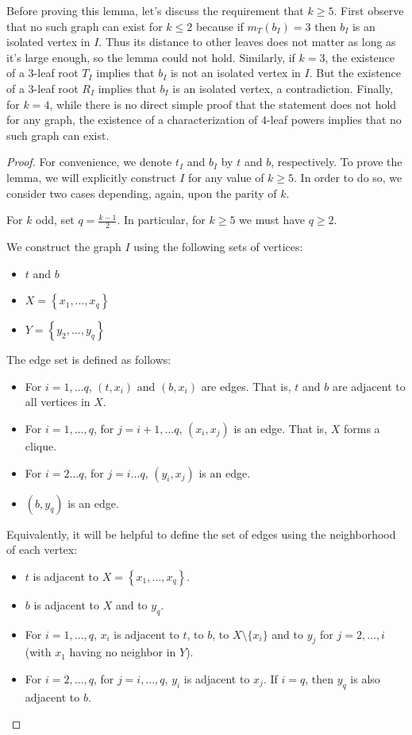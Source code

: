 \documentclass[11pt,letter]{article}
\theoremstyle{remark}
\newcommand{\set}[1]{\left\{#1\right\}}
\begin{document}
\ind*

Before proving this lemma, let's discuss the requirement that $k\ge 5$.
First observe that no such graph can exist for $k\leq 2$ because if $m_T(b_I)=3$ then $b_I$ is an isolated vertex in $I$. Thus its distance to other leaves does not matter as long as it's large enough, so the lemma could not hold.
Similarly, if $k=3$, the existence of a $3$-leaf root $T_I$ implies that $b_I$ is not an isolated vertex in $I$. But the existence of a $3$-leaf root $R_I$ implies that $b_I$ is an isolated vertex, a contradiction. 
Finally, for $k=4$, while there is no direct simple proof that the statement does not hold for any graph, 
the existence of a characterization of $4$-leaf powers implies that no such graph can exist.

\begin{proof}
    For convenience, we denote $t_I$ and $b_I$ by $t$ and $b$, respectively.
    To prove the lemma, we will explicitly construct $I$ for any value of $k\geq 5$. In order to do so, we consider two cases
    depending, again, upon the parity of $k$.

    For $k$ odd, set $q=\frac{k-1}{2}$. In particular, for $k\geq 5$ we must have $q\geq 2$. 
    
    We construct the graph $I$ using the following sets of vertices: 
    \begin{itemize}
        \item $t$ and $b$
        \item $X=\set{x_1,\dots, x_q}$
        \item $Y=\set{y_2,\dots, y_q}$
    \end{itemize}

    The edge set is defined as follows:
    \begin{itemize}
        \item For $i=1,\dots q$, $(t,x_i)$ and $(b,x_i)$ are edges. That is, $t$ and $b$ are adjacent to all vertices in $X$.
        \item For $i=1,\dots, q$, for $j=i+1,\dots q$, $(x_i,x_j)$ is an edge. That is, $X$ forms a clique. 
        \item For $i=2\dots q$, for $j=i\dots q$, $(y_i,x_j)$ is an edge. 
        \item $(b,y_q)$ is an edge.
    \end{itemize}
Equivalently, it will be helpful to define the set of edges using the neighborhood of each vertex:
    \begin{itemize}
        \item $t$ is adjacent to $X=\set{x_1,\dots,x_q}$.
        \item $b$ is adjacent to $X$ and to $y_q$.
        \item For $i=1,\dots, q$, $x_i$ is adjacent to $t$, to $b$, to $X\setminus \{x_i\}$ and to $y_j$ for $j=2,\dots, i$ (with $x_1$ having no neighbor in $Y$). 
        \item For $i=2,\dots, q$, for $j=i,\dots, q$, $y_i$ is adjacent to $x_j$. If $i=q$, then $y_q$ is also adjacent to $b$.
    \end{itemize}
    

\end{proof}
\end{document}
